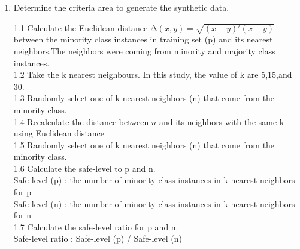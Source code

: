\begin{enumerate}
\item{ Determine the criteria area to generate the synthetic data.

    1.1 Calculate the Euclidean distance $∆(x,y) = \sqrt {(x − y)′ (x − y)}$ between the minority class instances in training set (p) and its nearest neighbors.The neighbors were coming from minority and majority class instances. \\
    1.2 Take the k nearest neighbours. In this study, the value of k are 5,15,and 30.  \\
    1.3 Randomly select one of k nearest neighbors (n) that come from the minority class.  \\
    1.4 Recalculate the distance between $n$ and its neighbors with the same k using Euclidean distance  \\
    1.5 Randomly select one of k nearest neighbors (n) that come from the minority class.  \\
    1.6 Calculate the safe-level to p and n.  \\
        Safe-level (p) : the number of minority class instances in k nearest neighbors for p  \\
        Safe-level (n) : the number of minority class instances in k nearest neighbors for n  \\
    1.7 Calculate the safe-level ratio for p and n.  \\
                 Safe-level ratio : Safe-level (p) / Safe-level (n) \\}
    

\end{enumerate}
